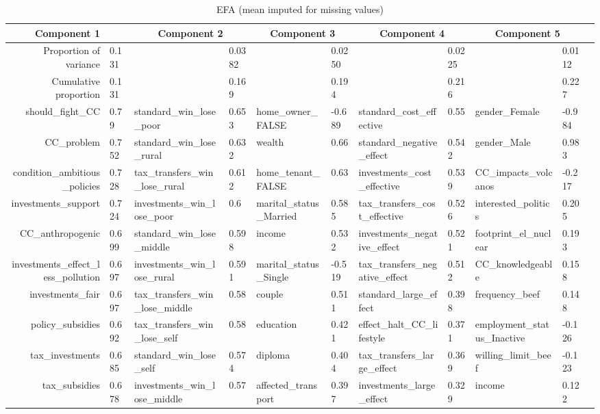 \begin{table}[ht]
  \caption{EFA (mean imputed for missing values)}
\centering
\begin{tabular}{rllllllllll}
  \hline
  \multicolumn{2}{c}{Component 1} & \multicolumn{2}{c}{Component 2} & \multicolumn{2}{c}{Component 3} & \multicolumn{2}{c}{Component 4} & \multicolumn{2}{c}{Component 5} \\ 
  \hline
 Proportion of variance & 0.131 &  & 0.0382 &  & 0.0250 &  & 0.0225 &  & 0.0112 \\ 
Cumulative proportion & 0.131 &  & 0.169 &  & 0.194 &  & 0.216 &  & 0.227 \\ \hline 
should\_fight\_CC & 0.79 & standard\_win\_lose\_poor & 0.653 & home\_owner\_FALSE & -0.689 & standard\_cost\_effective & 0.55 & gender\_Female & -0.984 \\ 
 CC\_problem & 0.752 & standard\_win\_lose\_rural & 0.632 & wealth & 0.66 & standard\_negative\_effect & 0.542 & gender\_Male & 0.983 \\ 
condition\_ambitious\_policies & 0.728 & tax\_transfers\_win\_lose\_rural & 0.612 & home\_tenant\_FALSE & 0.63 & investments\_cost\_effective & 0.539 & CC\_impacts\_volcanos & -0.217 \\ 
investments\_support & 0.724 & investments\_win\_lose\_poor & 0.6 & marital\_status\_Married & 0.585 & tax\_transfers\_cost\_effective & 0.526 & interested\_politics & 0.205 \\ 
 CC\_anthropogenic & 0.699 & standard\_win\_lose\_middle & 0.598 & income & 0.532 & investments\_negative\_effect & 0.521 & footprint\_el\_nuclear & 0.193 \\ 
 investments\_effect\_less\_pollution & 0.697 & investments\_win\_lose\_rural & 0.591 & marital\_status\_Single & -0.519 & tax\_transfers\_negative\_effect & 0.512 & CC\_knowledgeable & 0.158 \\ 
 investments\_fair & 0.697 & tax\_transfers\_win\_lose\_middle & 0.58 & couple & 0.511 & standard\_large\_effect & 0.398 & frequency\_beef & 0.148 \\ 
policy\_subsidies & 0.692 & tax\_transfers\_win\_lose\_self & 0.58 & education & 0.421 & effect\_halt\_CC\_lifestyle & 0.371 & employment\_status\_Inactive & -0.126 \\ 
tax\_investments & 0.685 & standard\_win\_lose\_self & 0.574 & diploma & 0.404 & tax\_transfers\_large\_effect & 0.369 & willing\_limit\_beef & -0.123 \\ 
 tax\_subsidies & 0.678 & investments\_win\_lose\_middle & 0.57 & affected\_transport & 0.397 & investments\_large\_effect & 0.329 & income & 0.122 \\ 
   \hline
\end{tabular}
\end{table}
